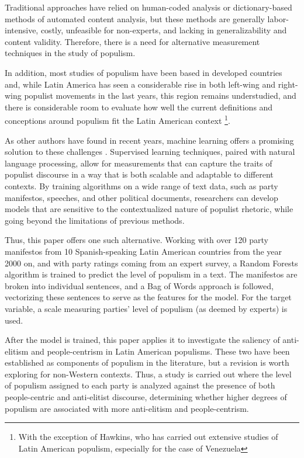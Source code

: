 \documentclass[12pt,letterpaper]{article}
\begin{document}
Traditional approaches have relied on human-coded analysis or dictionary-based methods of automated content analysis, but these methods are generally labor-intensive, costly, unfeasible for non-experts, and lacking in generalizability and content validity. Therefore, there is a need for alternative measurement techniques in the study of populism.  

In addition, most studies of populism have been based in developed countries and, while Latin America has seen a considerable rise in both left-wing and right-wing populist movements in the last years, this region remains understudied, and there is considerable room to evaluate how well the current definitions and conceptions around populism fit the Latin American context 
\footnote{With the exception of Hawkins, who has carried out extensive studies of Latin American populism, especially for the case of Venezuela}. 

As other authors have found in recent years, machine learning offers a promising solution to these challenges \autocite{coccoHowPopulistAre2022} \autocite{daiMeasuringPopulismContext}. Supervised learning techniques, paired with natural language processing, allow for measurements that can capture the traits of populist discourse in a way that is both scalable and adaptable to different contexts. By training algorithms on a wide range of text data, such as party manifestos, speeches, and other political documents, researchers can develop models that are sensitive to the contextualized nature of populist rhetoric, while going beyond the limitations of previous methods.

Thus, this paper offers one such alternative. Working with over 120 party manifestos from 10 Spanish-speaking Latin American countries from the year 2000 on, and with party ratings coming from an expert survey, a Random Forests algorithm is trained to predict the level of populism in a text. The manifestos are broken into individual sentences, and a Bag of Words approach is followed, vectorizing these sentences to serve as the features for the model. For the target variable, a scale measuring parties' level of populism (as deemed by experts) is used.  

After the model is trained, this paper applies it to investigate the saliency of anti-elitism and people-centrism in Latin American populisms. These two have been established as components of populism in the literature, but a revision is worth exploring for non-Western contexts. Thus, a study is carried out where the level of populism assigned to each party is analyzed against the presence of both people-centric and anti-elitist discourse, determining whether higher degrees of populism are associated with more anti-elitism and people-centrism. 
\end{document}
